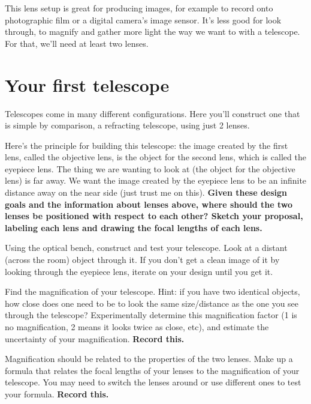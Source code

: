 This lens setup is great for producing images, for example to record onto photographic film or a digital camera's image sensor. It's less good for look through, to magnify and gather more light the way we want to with a telescope. For that, we'll need at least two lenses.

\section{Your first telescope}

Telescopes come in many different configurations. Here you'll construct one that is simple by comparison, a refracting telescope, using just 2 lenses.

\begin{steps}
	\item Here's the principle for building this telescope: the image created by the first lens, called the objective lens, is the object for the second lens, which is called the eyepiece lens. The thing we are wanting to look at (the object for the objective lens) is far away. We want the image created by the eyepiece lens to be an infinite distance away on the near side (just trust me on this). \textbf{Given these design goals and the information about lenses above, where should the two lenses be positioned with respect to each other? Sketch your proposal, labeling each lens and drawing the focal lengths of each lens.}
	
	\item Using the optical bench, construct and test your telescope. Look at a distant (across the room) object through it. If you don't get a clean image of it by looking through the eyepiece lens, iterate on your design until you get it.
	
	\item Find the magnification of your telescope. Hint: if you have two identical objects, how close does one need to be to look the same size/distance as the one you see through the telescope? Experimentally determine this magnification factor (1 is no magnification, 2 means it looks twice as close, etc), and estimate the uncertainty of your magnification. \textbf{Record this.}
	
	\item Magnification should be related to the properties of the two lenses. Make up a formula that relates the focal lengths of your lenses to the magnification of your telescope. You may need to switch the lenses around or use different ones to test your formula. \textbf{Record this.}
\end{steps}

